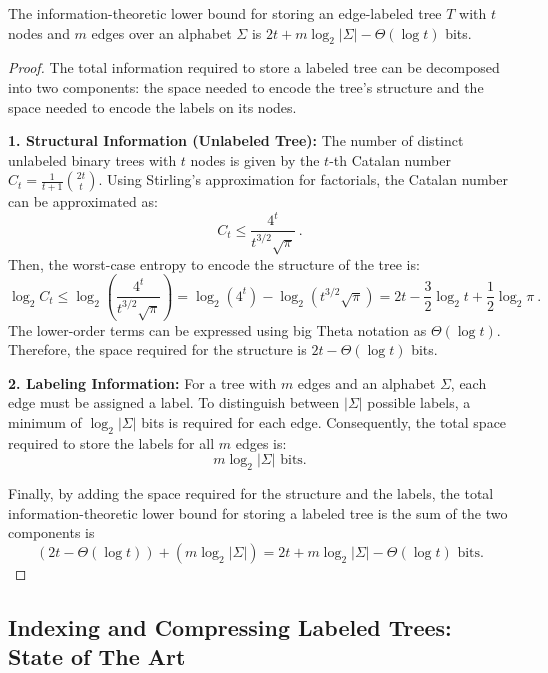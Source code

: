 \begin{lemma} \label{lem:info_theoretic_lower_bound}
The information-theoretic lower bound for storing an edge-labeled tree $T$ with $t$ nodes and $m$ edges over an alphabet $\Sigma$ is $2t + m \log_2 |\Sigma| - \Theta(\log t)$ bits.
\end{lemma}

\begin{proof}
The total information required to store a labeled tree can be decomposed into two components: the space needed to encode the tree's structure and the space needed to encode the labels on its nodes.

\textbf{1. Structural Information (Unlabeled Tree):}
The number of distinct unlabeled binary trees with $t$ nodes is given by the $t$-th Catalan number $C_t = \frac{1}{t+1} \binom{2t}{t}$. Using Stirling's approximation for factorials, the Catalan number can be approximated as:
$$C_t \leq \frac{4^t}{t^{3/2}\sqrt{\pi}} ~.$$
Then, the worst-case entropy to encode the structure of the tree is:
$$\log_2 C_t \leq \log_2\left(\frac{4^t}{t^{3/2}\sqrt{\pi}}\right) = \log_2(4^t) - \log_2(t^{3/2}\sqrt{\pi}) = 2t - \frac{3}{2}\log_2 t +\frac{1}{2}\log_2 \pi ~.$$
The lower-order terms can be expressed using big Theta notation as $\Theta(\log t)$. Therefore, the space required for the structure is $2t - \Theta(\log t)$ bits.

\textbf{2. Labeling Information:}
For a tree with $m$ edges and an alphabet $\Sigma$, each edge must be assigned a label. To distinguish between $|\Sigma|$ possible labels, a minimum of $\log_2 |\Sigma|$ bits is required for each edge. Consequently, the total space required to store the labels for all $m$ edges is:
$$m \log_2 |\Sigma| \text{ bits.}$$

Finally, by adding the space required for the structure and the labels, the total information-theoretic lower bound for storing a labeled tree is the sum of the two components is
$$ (2t - \Theta(\log t)) + (m \log_2 |\Sigma|) = 2t + m \log_2 |\Sigma| - \Theta(\log t) \text{ bits.} $$
\end{proof}



\subsection{Indexing and Compressing Labeled Trees: State of The Art} \label{sec:state-of-the-art}

